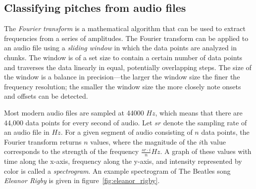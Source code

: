 \subsection{Classifying pitches from audio files}

The \textit{Fourier transform} is a mathematical algorithm that can be used to extract frequencies from a series of amplitudes. The Fourier transform can be applied to an audio file using a \textit{sliding window} in which the data points are analyzed in chunks. The window is of a set size to contain a certain number of data points and traverses the data linearly in equal, potentially overlapping steps. The size of the window is a balance in precision---the larger the window size the finer the frequency resolution; the smaller the window size the more closely note onsets and offsets can be detected.

Most modern audio files are sampled at 44000 $Hz$, which means that there are 44,000 data points for every second of audio. Let $sr$ denote the sampling rate of an audio file in $Hz$. For a given segment of audio consisting of $n$ data points, the Fourier transform returns $n$ values, where the magnitude of the $i$th value corresponds to the strength of the frequency $\frac{sr \cdot i}{n}Hz$. A graph of these values with time along the x-axis, frequency along the y-axis, and intensity represented by color is called a \textit{spectrogram}. An example spectrogram of The Beatles song \textit{Eleanor Rigby} is given in figure~\ref{fig:eleanor_rigby}.

